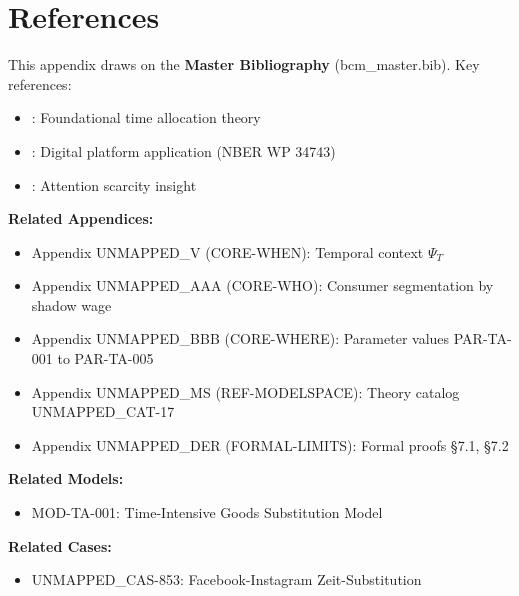 \section{References}
\label{sec:pt-references}

This appendix draws on the \textbf{Master Bibliography} (bcm\_master.bib). Key references:

\begin{itemize}[nosep]
\item \citet{becker1965theory}: Foundational time allocation theory
\item \citet{goodman2026timeintensive}: Digital platform application (NBER WP 34743)
\item \citet{simon1971designing}: Attention scarcity insight
\end{itemize}

\nocite{bcm_master}


\begin{tcolorbox}[colback=white, colframe=black,
    title=Cross-References]

\textbf{Related Appendices:}
\begin{itemize}[nosep]
\item Appendix UNMAPPED_V (CORE-WHEN): Temporal context $\Psi_T$
\item Appendix UNMAPPED_AAA (CORE-WHO): Consumer segmentation by shadow wage
\item Appendix UNMAPPED_BBB (CORE-WHERE): Parameter values PAR-TA-001 to PAR-TA-005
\item Appendix UNMAPPED_MS (REF-MODELSPACE): Theory catalog UNMAPPED_CAT-17
\item Appendix UNMAPPED_DER (FORMAL-LIMITS): Formal proofs §7.1, §7.2
\end{itemize}

\textbf{Related Models:}
\begin{itemize}[nosep]
\item MOD-TA-001: Time-Intensive Goods Substitution Model
\end{itemize}

\textbf{Related Cases:}
\begin{itemize}[nosep]
\item UNMAPPED_CAS-853: Facebook-Instagram Zeit-Substitution
\end{itemize}

\end{tcolorbox}

